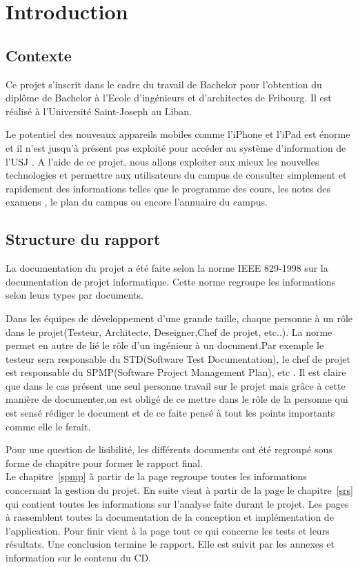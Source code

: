 \documentclass[12pt,a4paper,twoside]{report}
\begin{document}
\cleardoublepage
\chapter{Introduction}
\cleardoublepage
\section{Contexte}
Ce projet s'inscrit dans le cadre du travail de Bachelor pour l'obtention du diplôme de Bachelor à l'Ecole d'ingénieurs et d'architectes de Fribourg. Il est réalisé à l'Université Saint-Joseph au Liban. 

Le potentiel des nouveaux appareils mobiles comme l'iPhone et l'iPad est énorme et il n'est jusqu'à présent pas exploité pour accéder au système d'information de l'\gls{USJ} . A l'aide de ce projet, nous allons exploiter aux mieux les nouvelles technologies et permettre aux utilisateurs du campus de consulter simplement et rapidement des informations telles que le programme des cours, les notes des examens , le plan du campus ou encore l'annuaire du campus.

\section{Structure du rapport}
La documentation du projet a été faite selon la norme IEEE 829-1998 sur la documentation de projet informatique. Cette norme regroupe les informations selon leurs types par documents. 

Dans les équipes de développement d'une grande taille, chaque personne à un rôle dans le projet(Testeur, Architecte, Deseigner,Chef de projet, etc..). La norme permet  en autre de lié le rôle d'un ingénieur à un document.Par exemple le testeur sera responsable du STD(Software Test Documentation), le chef de projet est responsable du SPMP(Software Project Management Plan), etc . Il est claire que dans le cas présent une seul personne travail sur le projet mais grâce à cette manière de documenter,on est obligé de ce mettre dans le rôle de la personne qui est sensé rédiger le document et de ce faite pensé à tout les points importants comme elle le ferait.

Pour une question de lisibilité, les différents documents ont été regroupé sous forme de chapitre pour former le rapport final.\\
Le chapitre~\ref{spmp} à partir de la page \pageref{spmp} regroupe toutes les informations concernant la gestion du projet. En suite vient à partir de la page \pageref{srs} le chapitre~\ref{srs}  qui contient toutes les informations sur l'analyse faite durant le projet. Les pages \pageref{sdd} à \pageref{std} rassemblent toutes la documentation de la conception et implémentation de l'application.  Pour finir vient à la page \pageref{std} tout ce qui concerne les tests et leurs résultats. 
Une conclusion termine le rapport. Elle est suivit par les annexes et information sur le contenu du CD.
\end{document}

